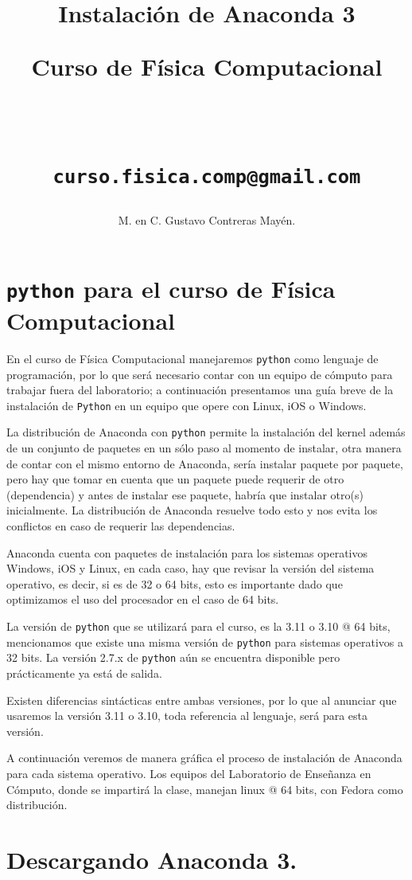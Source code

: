 \documentclass[12pt]{article}
\author{M. en C. Gustavo Contreras Mayén.}
\title{Instalación de Anaconda 3 \\ \begin{Large} Curso de Física Computacional\end{Large} \\
\begin{small}
\texttt{curso.fisica.comp@gmail.com}
\end{small}}
\date{ }
\begin{document}
\maketitle
\fontsize{14}{14}\selectfont
\section{\texttt{python} para el curso de Física Computacional}
En el curso de Física Computacional manejaremos \texttt{python} como lenguaje de programación, por lo que será necesario contar con un equipo de cómputo para trabajar fuera del laboratorio; a continuación presentamos una guía breve de la instalación de \texttt{Python} en un equipo que opere con Linux, iOS o Windows.
\par
La distribución de Anaconda con \texttt{python} permite la instalación del kernel además de un conjunto de paquetes en un sólo paso al momento de instalar, otra manera de contar con el mismo entorno de Anaconda, sería instalar paquete por paquete, pero hay que tomar en cuenta que un paquete puede requerir de otro (dependencia) y antes de instalar ese paquete, habría que instalar otro(s) inicialmente. La distribución de Anaconda resuelve todo esto y nos evita los conflictos en caso de requerir las dependencias.
\par
Anaconda cuenta con paquetes de instalación para los sistemas operativos Windows, iOS y Linux, en cada caso, hay que revisar la versión del sistema operativo, es decir, si es de 32 o 64 bits, esto es importante dado que optimizamos el uso del procesador en el caso de 64 bits.
\par
La versión de \texttt{python} que se utilizará para el curso, es la 3.11 o 3.10 @ 64 bits, mencionamos que existe una misma versión de \texttt{python} para sistemas operativos a 32 bits. La versión 2.7.x de \texttt{python} aún se encuentra disponible pero prácticamente ya está de salida.
\par
Existen diferencias sintácticas entre ambas versiones, por lo que al anunciar que usaremos la versión 3.11 o 3.10, toda referencia al lenguaje, será para esta versión.
\par
A continuación veremos de manera gráfica el proceso de instalación de Anaconda para cada sistema operativo. Los equipos del Laboratorio de Enseñanza en Cómputo, donde se impartirá la clase, manejan linux @ 64 bits, con Fedora como distribución.

\section{Descargando Anaconda 3.}
\end{document}
